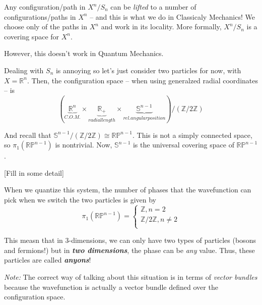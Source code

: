 \documentclass{article}
\newcommand{\R}{\mathbb{R}}
\begin{document}
\vskip 0.5cm
Any configuration/path in $X^n / S_n$ can be \emph{lifted} to a number of configurations/paths in $X^n$ -- and this is what we do in Classicaly Mechanics! We choose only of the paths in $X^n$ and work in its locality. More formally, $X^n / S_n$ is a covering space for $X^n$.

\vskip 0.5cm
However, this doesn't work in Quantum Mechanics.

\vskip 0.5cm
Dealing with $S_n$ is annoying so let's just consider two particles for now, with $X = \R^n$. Then, the configuration space -- when using generalzed radial coordinates -- is 
\[ \left(\underbrace{\R^n}_{C.O.M.} \times \underbrace{\R_+}_{radial length} \times \underbrace{\mathbb{S}^{n-1}}_{rel. angular position}\right) / \left(\mathbb{Z}/2\mathbb{Z}\right) \]

And recall that $\mathbb{S}^{n-1} / \left(\mathbb{Z} / 2\mathbb{Z}\right)\cong \mathbb{RP}^{n-1}$. This is not a simply connected space, so $\pi_1\left(\mathbb{RP}^{n-1}\right)$ is nontrivial. Now, $\mathbb{S}^{n-1}$ is the universal covering space of $\mathbb{RP}^{n-1}$.

\vskip 0.5cm
[Fill in some detail]

\vskip 0.5cm
When we quantize this system, the number of phases that the wavefunction can pick when we switch the two particles is given by 
\[ \pi_1(\mathbb{RP}^{n-1}) = \begin{cases}
  \mathbb{Z}, n = 2 \\
  \mathbb{Z} / 2 \mathbb{Z}, n \neq 2 \\
\end{cases} \]

\vskip 0.5cm
This measn that in 3-dimensions, we can only have two types of particles (bosons and fermions!) but in \emph{\textbf{two dimensions}}, the phase can be \emph{any} value. Thus, these particles are called \emph{\textbf{anyons}}!

\vskip 0.5cm
\begin{dottedbox}
  \emph{Note:} The correct way of talking about this situation is in terms of \emph{vector bundles} because the wavefunction is actually a vector bundle defined over the configuration space.
\end{dottedbox}
\end{document}

